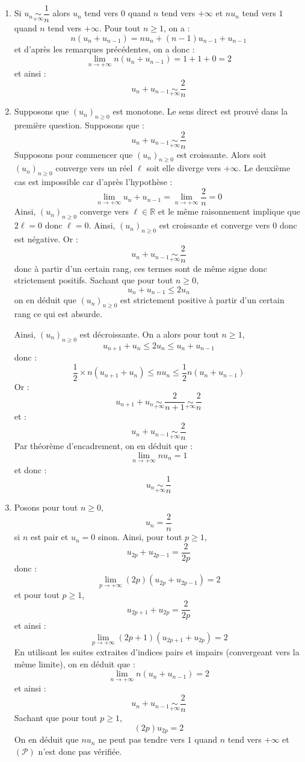 \documentclass[a4paper,twoside,french,10pt]{VcCours}
\begin{document}
\begin{enumerate}
\item Si $u_n \underset{+ \infty}{\sim} \dfrac{1}{n}$ alors $u_n$ tend vers $0$ quand $n$ tend vers $+ \infty$ et $n u_n $ tend vers $1$ quand $n$ tend vers $+ \infty$. Pour tout $n \geq 1$, on a :
$$n(u_n + u_{n-1}) = n u_n + (n-1)u_{n-1}  + u_{n-1}$$
et d'après les remarques précédentes, on a donc :
$$ \lim_{n \rightarrow + \infty} n(u_n + u_{n-1})  = 1+1+0 = 2$$
et ainsi :
$$ u_n + u_{n-1} \underset{+ \infty}{\sim} \dfrac{2}{n}$$

\item Supposons que $(u_n)_{n \geq 0}$ est monotone. Le sens direct est prouvé dans la première question. Supposons que :
$$ u_n + u_{n-1} \underset{+ \infty}{\sim} \dfrac{2}{n}$$
Supposons pour commencer que $(u_n)_{n \geq 0}$ est croissante. Alors soit $(u_n)_{n \geq 0}$ converge vers un réel $\ell$ soit elle diverge vers $+ \infty$. Le deuxième cas est impossible car d'après l'hypothèse :
$$ \lim_{n \rightarrow + \infty} u_n + u_{n-1} = \lim_{n \rightarrow + \infty} \dfrac{2}{n} = 0$$
Ainsi, $(u_n)_{n \geq 0}$ converge vers $\ell \in \mathbb{R}$ et le même raisonnement implique que $2 \ell =0$ donc $\ell =0$. Ainsi, $(u_n)_{n \geq 0}$ est croissante et converge vers $0$ donc est négative. Or :
$$ u_n + u_{n-1} \underset{+ \infty}{\sim} \dfrac{2}{n}$$
donc à partir d'un certain rang, ces termes sont de même signe donc strictement positifs. Sachant que pour tout $n \geq 0$,
$$ u_n + u_{n-1} \leq 2u_n$$
on en déduit que $(u_n)_{n \geq 0}$ est strictement positive à partir d'un certain rang ce qui est absurde.

\medskip

\noindent Ainsi, $(u_n)_{n \geq 0}$ est décroissante. On a alors pour tout $n \geq 1$,
$$ u_{n+1}+u_n \leq    2u_n \leq u_n + u_{n-1}$$
donc :
$$ \dfrac{1}{2} \times n(u_{n+1}+u_n) \leq   nu_n \leq \dfrac{1}{2} n(u_n + u_{n-1})$$
Or :
$$  u_{n+1}+u_n \underset{+ \infty}{\sim} \dfrac{2}{n+1} \underset{+ \infty}{\sim} \dfrac{2}{n}$$
et :
$$  u_n + u_{n-1} \underset{+ \infty}{\sim} \dfrac{2}{n} $$
Par théorème d'encadrement, on en déduit que :
$$ \lim_{n \rightarrow + \infty} n u_n  = 1$$
et donc :
$$u_n \underset{+ \infty}{\sim} \dfrac{1}{n}$$
\item Posons pour tout $n \geq 0$,
$$ u_n = \dfrac{2}{n}$$
si $n$ est pair et $u_n=0$ sinon. Ainsi, pour tout $p \geq 1$,
$$ u_{2p} + u_{2p-1} =  \dfrac{2}{2p}$$
donc :
$$ \lim_{p \rightarrow + \infty} (2p) (u_{2p} + u_{2p-1}) = 2$$
et pour tout $p \geq 1$,
$$ u_{2p+1} + u_{2p} = \dfrac{2}{2p}$$
et ainsi :
$$ \lim_{p \rightarrow + \infty} (2p+1)(u_{2p+1} + u_{2p}) = 2$$
En utilisant les suites extraites d'indices pairs et impairs (convergeant vers la même limite), on en déduit que :
$$ \lim_{n \rightarrow + \infty} n (u_n + u_{n-1}) = 2$$
et ainsi :
$$ u_n + u_{n-1} \underset{+ \infty}{\sim} \dfrac{2}{n} $$
Sachant que pour tout $p \geq 1$,
$$ (2p) u_{2p} = 2 $$
On en déduit que $nu_n$ ne peut pas tendre vers $1$ quand $n$ tend vers $+ \infty$ et $(\mathcal{P})$ n'est donc pas vérifiée.
\end{enumerate}
\end{document}
